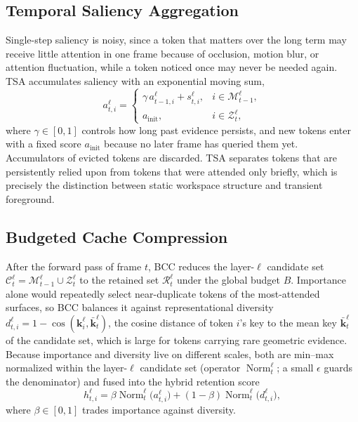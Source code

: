 \subsection{Temporal Saliency Aggregation}
\label{sec:tsa}

Single-step saliency is noisy, since a token that matters over the long term may receive little attention in one frame because of occlusion, motion blur, or attention fluctuation, while a token noticed once may never be needed again. TSA accumulates saliency with an exponential moving sum,
\begin{equation}
a^{\ell}_{t,i} =
\begin{cases}
\gamma\, a^{\ell}_{t-1,i} + s^{\ell}_{t,i}, & i\in\mathcal{M}^{\ell}_{t-1},\\[2pt]
a_{\mathrm{init}}, & i\in\mathcal{Z}^{\ell}_{t},
\end{cases}
\label{eq:tsa}
\end{equation}
where $\gamma\in[0,1]$ controls how long past evidence persists, and new tokens enter with a fixed score $a_{\mathrm{init}}$ because no later frame has queried them yet. Accumulators of evicted tokens are discarded. TSA separates tokens that are persistently relied upon from tokens that were attended only briefly, which is precisely the distinction between static workspace structure and transient foreground.

\subsection{Budgeted Cache Compression}
\label{sec:bcc}

After the forward pass of frame $t$, BCC reduces the layer-$\ell$ candidate set $\mathcal{C}^{\ell}_{t}=\mathcal{M}^{\ell}_{t-1}\cup\mathcal{Z}^{\ell}_{t}$ to the retained set $\mathcal{R}^{\ell}_{t}$ under the global budget $B$. Importance alone would repeatedly select near-duplicate tokens of the most-attended surfaces, so BCC balances it against representational diversity $d^{\ell}_{t,i} = 1 - \cos(\mathbf{k}^{\ell}_{i}, \bar{\mathbf{k}}^{\ell}_{t})$, the cosine distance of token $i$'s key to the mean key $\bar{\mathbf{k}}^{\ell}_{t}$ of the candidate set, which is large for tokens carrying rare geometric evidence. Because importance and diversity live on different scales, both are min--max normalized within the layer-$\ell$ candidate set (operator $\operatorname{Norm}^{\ell}_{t}$; a small $\epsilon$ guards the denominator) and fused into the hybrid retention score
\begin{equation}
h^{\ell}_{t,i}
= \beta \operatorname{Norm}^{\ell}_{t}\!\bigl(a^{\ell}_{t,i}\bigr)
+ (1-\beta)\operatorname{Norm}^{\ell}_{t}\!\bigl(d^{\ell}_{t,i}\bigr),
\label{eq:hybrid}
\end{equation}
where $\beta\in[0,1]$ trades importance against diversity.

